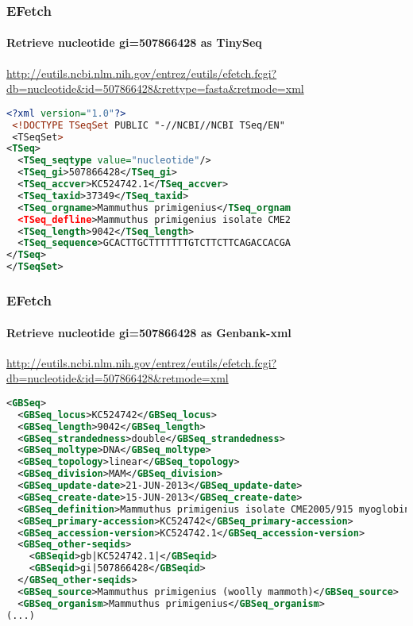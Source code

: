 \documentclass{beamer}
\begin{document}
\begin{frame}[fragile]
\frametitle{EFetch}
\framesubtitle{Retrieve nucleotide gi=507866428 as TinySeq}
\url{http://eutils.ncbi.nlm.nih.gov/entrez/eutils/efetch.fcgi?db=nucleotide&id=507866428&rettype=fasta&retmode=xml}
\begin{lstlisting}[language=xml,basicstyle=\tiny,breaklines=false]
<?xml version="1.0"?>
 <!DOCTYPE TSeqSet PUBLIC "-//NCBI//NCBI TSeq/EN" 
 <TSeqSet>
<TSeq>
  <TSeq_seqtype value="nucleotide"/>
  <TSeq_gi>507866428</TSeq_gi>
  <TSeq_accver>KC524742.1</TSeq_accver>
  <TSeq_taxid>37349</TSeq_taxid>
  <TSeq_orgname>Mammuthus primigenius</TSeq_orgnam
  <TSeq_defline>Mammuthus primigenius isolate CME2
  <TSeq_length>9042</TSeq_length>
  <TSeq_sequence>GCACTTGCTTTTTTTGTCTTCTTCAGACCACGA
</TSeq>
</TSeqSet>
\end{lstlisting}
\end{frame}


\begin{frame}[fragile]
\frametitle{EFetch}
\framesubtitle{Retrieve nucleotide gi=507866428 as Genbank-xml}
\url{http://eutils.ncbi.nlm.nih.gov/entrez/eutils/efetch.fcgi?db=nucleotide&id=507866428&retmode=xml}
\begin{lstlisting}[language=xml,basicstyle=\tiny,breaklines=false]
<GBSeq>
  <GBSeq_locus>KC524742</GBSeq_locus>
  <GBSeq_length>9042</GBSeq_length>
  <GBSeq_strandedness>double</GBSeq_strandedness>
  <GBSeq_moltype>DNA</GBSeq_moltype>
  <GBSeq_topology>linear</GBSeq_topology>
  <GBSeq_division>MAM</GBSeq_division>
  <GBSeq_update-date>21-JUN-2013</GBSeq_update-date>
  <GBSeq_create-date>15-JUN-2013</GBSeq_create-date>
  <GBSeq_definition>Mammuthus primigenius isolate CME2005/915 myoglobin (Mb) gene, partial cds</GBSeq_definition>
  <GBSeq_primary-accession>KC524742</GBSeq_primary-accession>
  <GBSeq_accession-version>KC524742.1</GBSeq_accession-version>
  <GBSeq_other-seqids>
    <GBSeqid>gb|KC524742.1|</GBSeqid>
    <GBSeqid>gi|507866428</GBSeqid>
  </GBSeq_other-seqids>
  <GBSeq_source>Mammuthus primigenius (woolly mammoth)</GBSeq_source>
  <GBSeq_organism>Mammuthus primigenius</GBSeq_organism>
(...)
\end{lstlisting}
\end{frame}
\end{document}
